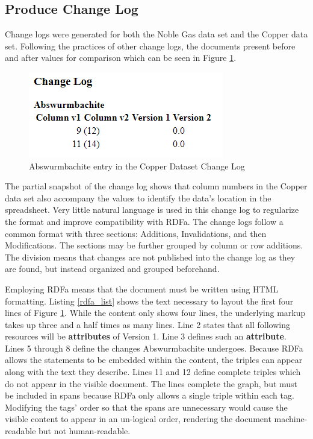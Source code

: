 \subsection{Produce Change Log}

Change logs were generated for both the Noble Gas data set and the Copper data set.
Following the practices of other change logs, the documents present before and after values for comparison which can be seen in Figure \ref{changelog_zoomed}.
\begin{figure}
	\centering
	\includegraphics[scale=0.80]{figures/Changelog-zoomed.png}
	\caption{Abswurmbachite entry in the Copper Dataset Change Log}
	\label{changelog_zoomed}
\end{figure}
The partial snapshot of the change log shows that column numbers in the Copper data set also accompany the values to identify the data's location in the spreadsheet.
Very little natural language is used in this change log to regularize the format and improve compatibility with RDFa.
The change logs follow a common format with three sections: Additions, Invalidations, and then Modifications.
The sections may be further grouped by column or row additions.
The division means that changes are not published into the change log as they are found, but instead organized and grouped beforehand.

Employing RDFa means that the document must be written using HTML formatting.
Listing \ref{rdfa_list} shows the text necessary to layout the first four lines of Figure \ref{changelog_zoomed}.
While the content only shows four lines, the underlying markup takes up three and a half times as many lines.
Line 2 states that all following resources will be \textbf{attributes} of Version 1.
Line 3 defines such an \textbf{attribute}.
Lines 5 through 8 define the changes Abswurmbachite undergoes.
Because RDFa allows the statements to be embedded within the content, the triples can appear along with the text they describe.
Lines 11 and 12 define complete triples which do not appear in the visible document.
The lines complete the graph, but must be included in spans because RDFa only allows a single triple within each tag.
Modifying the tags' order so that the spans are unnecessary would cause the visible content to appear in an un-logical order, rendering the document machine-readable but not human-readable.

